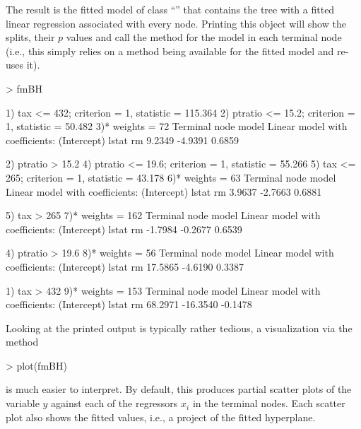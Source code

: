 \documentclass{Z}
\begin{document}
The result is the fitted model  of class ``'' that contains
the tree with a fitted linear regression associated with every node. Printing
this object will show the splits, their $p$ values and call the  method
for the model in each terminal node (i.e., this simply relies on a 
method being available for the fitted model and re-uses it).

\begin{Schunk}
\begin{Sinput}
> fmBH
\end{Sinput}
\begin{Soutput}
1) tax <= 432; criterion = 1, statistic = 115.364
  2) ptratio <= 15.2; criterion = 1, statistic = 50.482
    3)*  weights = 72 
Terminal node model
Linear model with coefficients:
(Intercept)        lstat           rm  
     9.2349      -4.9391       0.6859  

  2) ptratio > 15.2
    4) ptratio <= 19.6; criterion = 1, statistic = 55.266
      5) tax <= 265; criterion = 1, statistic = 43.178
        6)*  weights = 63 
Terminal node model
Linear model with coefficients:
(Intercept)        lstat           rm  
     3.9637      -2.7663       0.6881  

      5) tax > 265
        7)*  weights = 162 
Terminal node model
Linear model with coefficients:
(Intercept)        lstat           rm  
    -1.7984      -0.2677       0.6539  

    4) ptratio > 19.6
      8)*  weights = 56 
Terminal node model
Linear model with coefficients:
(Intercept)        lstat           rm  
    17.5865      -4.6190       0.3387  

1) tax > 432
  9)*  weights = 153 
Terminal node model
Linear model with coefficients:
(Intercept)        lstat           rm  
    68.2971     -16.3540      -0.1478  
\end{Soutput}
\end{Schunk}

Looking at the printed output is typically rather tedious, a visualization via
the  method

\begin{Schunk}
\begin{Sinput}
> plot(fmBH)
\end{Sinput}
\end{Schunk}

is much easier to interpret. By default, this produces partial scatter plots of the
variable $y$ against each of the regressors $x_i$ in the terminal nodes. Each scatter
plot also shows the fitted values, i.e., a project of the fitted hyperplane.
\end{document}
